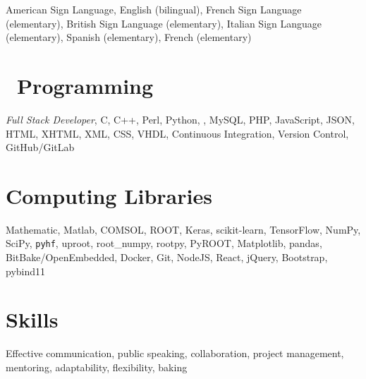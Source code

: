 \documentclass[margin,line]{resume}
\let\origsection\section%
\let\section\subsection%
\let\section\origsection%
\begin{document}
\begin{resume}
American Sign Language, English (bilingual), French Sign Language (elementary), British Sign Language (elementary), Italian Sign Language (elementary), Spanish (elementary), French (elementary)

\section{\mysidestyle {}~Programming}

\textsl{Full Stack Developer}, C, C++, Perl, Python, \LaTeXe, MySQL, PHP, JavaScript, JSON, HTML, XHTML, XML, CSS, VHDL, Continuous Integration, Version Control, GitHub/GitLab

\section{\mysidestyle Computing Libraries}

Mathematic, Matlab, COMSOL, ROOT, Keras, scikit-learn, TensorFlow, NumPy, SciPy, \texttt{pyhf}, uproot, root\_numpy, rootpy, PyROOT, Matplotlib, pandas, BitBake/OpenEmbedded, Docker, Git, NodeJS, React, jQuery, Bootstrap, pybind11

\section{\mysidestyle Skills}

Effective communication, public speaking, collaboration, project management, mentoring, adaptability, flexibility, baking

%
%
\end{resume}
\end{document}
